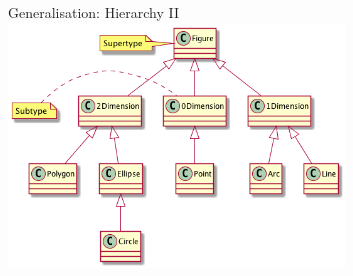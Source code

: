 \documentclass[10pt,t,a4paper]{beamer}
\begin{document}
\begin{frame}[label=sec-1-15]{Generalisation: Hierarchy II}
\includegraphics[height=6.5cm]{FInheritance2.png}
\end{frame}
\end{document}
